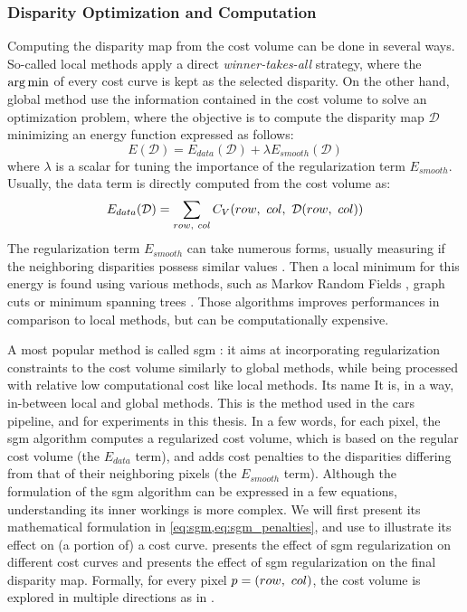 \subsubsection{Disparity Optimization and Computation}
Computing the disparity map from the cost volume can be done in several ways. So-called local methods apply a direct \textit{winner-takes-all} strategy, where the $\operatorname*{arg\,min}$ of every cost curve is kept as the selected disparity. On the other hand, global method use the information contained in the cost volume to solve an optimization problem, where the objective is to compute the disparity map $\mathcal{D}$ minimizing an energy function expressed as follows:
\begin{equation}
    E(\mathcal{D}) = E_{data}(\mathcal{D}) + \lambda E_{smooth}(\mathcal{D})
\end{equation}
where $\lambda$ is a scalar for tuning the importance of the regularization term $E_{smooth}$. Usually, the data term is directly computed from the cost volume as:
\begin{equation}\label{eq:global_methods}
    E_{data}(\mathcal{D}) = \sum_{row,~col}C_V(row, ~col,~\mathcal{D}(row, ~col))
\end{equation}
The regularization term $E_{smooth}$ can take numerous forms, usually measuring if the neighboring disparities possess similar values \cite{scharstein_taxonomy_2001}. Then a local minimum for this energy is found using various methods, such as Markov Random Fields \cite{boykov_markov_1998, sun_stereo_2003}, graph cuts \cite{kolmogorov_computing_2001} or minimum spanning trees \cite{zureiki_stereo_2008, qingxiong_yang_non-local_2012}. Those algorithms improves performances in comparison to local methods, but can be computationally expensive.

A most popular method is called \acrfull{sgm} \cite{hirschmuller_accurate_2005}: it aims at incorporating regularization constraints to the cost volume similarly to global methods, while being processed with relative low computational cost like local methods. Its name It is, in a way, in-between local and global methods. This is the method used in the \acrshort{cars} pipeline, and for experiments in this thesis. In a few words, for each pixel, the \acrshort{sgm} algorithm computes a regularized cost volume, which is based on the regular cost volume (the $E_{data}$ term), and adds cost penalties to the disparities differing from that of their neighboring pixels (the $E_{smooth}$ term). Although the formulation of the \acrshort{sgm} algorithm can be expressed in a few equations, understanding its inner workings is more complex. We will first present its mathematical formulation in \cref{eq:sgm,eq:sgm_penalties}, and use  to illustrate its effect on (a portion of) a cost curve.  presents the effect of \acrshort{sgm} regularization on different cost curves and  presents the effect of \acrshort{sgm} regularization on the final disparity map. Formally, for every pixel $p=(row, ~col)$, the cost volume is explored in multiple directions as in .

